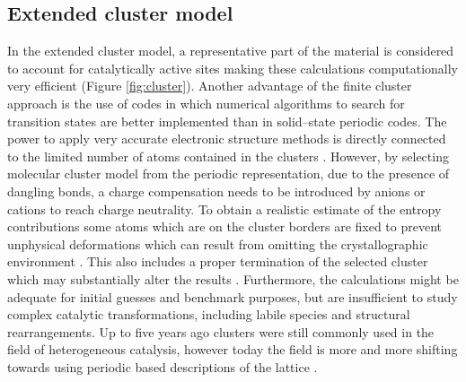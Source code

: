 \newpage
\subsection*{Extended cluster model}
In the extended cluster model, a representative part of the
material is considered to account for catalytically active sites making these
calculations computationally very efficient (Figure
\ref{fig:cluster}).
Another advantage of the finite cluster approach is the use of codes in which numerical algorithms to search for
transition states are better implemented than in solid--state periodic codes.
The power to apply very accurate electronic structure methods is directly connected
to the limited number of atoms contained in the clusters \cite{Lee2010,
Supronowicz2013, Bordiga2005}. However, by selecting molecular cluster model
from the periodic representation, due to the presence of dangling bonds, a charge
compensation needs to be introduced by anions or cations to reach charge
neutrality. To obtain a realistic estimate of the entropy contributions some
atoms which are on the cluster borders are fixed to prevent unphysical
deformations which can result from omitting the crystallographic
environment \cite{DeWispelaere2018}. This also includes a proper termination of
the selected cluster which may substantially alter the
results \cite{Supronowicz2013}. Furthermore, the calculations might be adequate
for initial guesses and benchmark purposes, but are insufficient to study complex catalytic transformations, including labile species and structural rearrangements.
Up to five years ago clusters were still commonly used in the field of
heterogeneous catalysis, however today the field is more and more shifting
towards using periodic based descriptions of the lattice \cite{Rogge2017,
Bernales2018, Evans2017, Fraux2017}.

